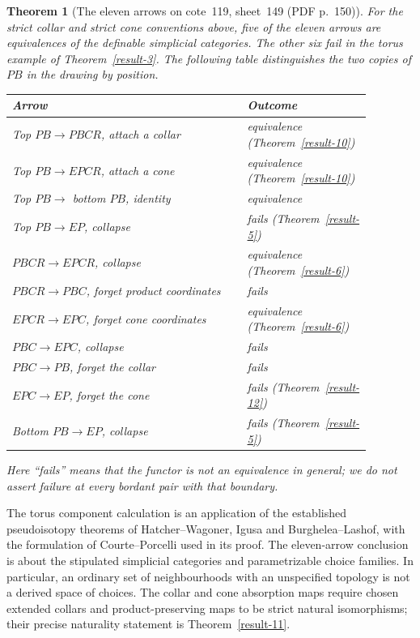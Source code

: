 \documentclass[11pt,a4paper]{article}
\newtheorem{theorem}{Theorem}[section]
\theoremstyle{definition}
\begin{document}
\begin{theorem}[The eleven arrows on cote~119, sheet~149 (PDF p.~150)]\label{result-13}
For the strict collar and strict cone conventions above, five of the
eleven arrows are equivalences of the definable simplicial categories.
The other six fail in the torus example of Theorem~\ref{result-3}. The following table
distinguishes the two copies of $PB$ in the drawing by position.
\begin{center}
\begin{tabular}{p{0.58\linewidth}p{0.30\linewidth}}
\toprule
Arrow & Outcome\\
\midrule
Top $PB\to PBCR$, attach a collar & equivalence (Theorem~\ref{result-10})\\
Top $PB\to EPCR$, attach a cone & equivalence (Theorem~\ref{result-10})\\
Top $PB\to$ bottom $PB$, identity & equivalence\\
Top $PB\to EP$, collapse & fails (Theorem~\ref{result-5})\\
$PBCR\to EPCR$, collapse & equivalence (Theorem~\ref{result-6})\\
$PBCR\to PBC$, forget product coordinates & fails\\
$EPCR\to EPC$, forget cone coordinates & equivalence (Theorem~\ref{result-6})\\
$PBC\to EPC$, collapse & fails\\
$PBC\to PB$, forget the collar & fails\\
$EPC\to EP$, forget the cone & fails (Theorem~\ref{result-12})\\
Bottom $PB\to EP$, collapse & fails (Theorem~\ref{result-5})\\
\bottomrule
\end{tabular}
\end{center}
Here ``fails'' means that the functor is not an equivalence in general;
we do not assert failure at every bordant pair with that boundary.
\end{theorem}

The torus component calculation is an application of the established
pseudoisotopy theorems of Hatcher--Wagoner, Igusa and
Burghelea--Lashof, with the formulation of Courte--Porcelli used in
its proof. The eleven-arrow conclusion is about the stipulated
simplicial categories and parametrizable choice families. In particular,
an ordinary set of neighbourhoods with an unspecified topology is not
a derived space of choices. The collar and cone absorption maps require
chosen extended collars and product-preserving maps to be strict natural
isomorphisms; their precise naturality statement is
Theorem~\ref{result-11}.
\end{document}

